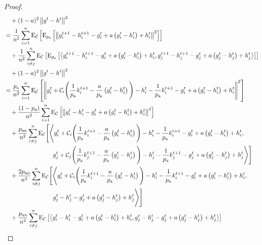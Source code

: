 \documentclass{article}
\newcommand*{\probavailable}{\ensuremath{p_{\textnormal{a}}}}
\newcommand*{\probpairaa}{\ensuremath{p_{\textnormal{aa}}}}
\newcommand*{\probpairan}{\ensuremath{p_{\textnormal{an}}}}
\newcommand*{\probpairnn}{\ensuremath{p_{\textnormal{nn}}}}
\begin{document}
\begin{proof}
\begin{align*}
    &\quad + (1 - a)^2\norm{g^{t} - h^{t}}^2\\
    &=\frac{1}{n^2}\sum_{i=1}^n\ExpSub{\cC}{\ExpSub{\probavailable}{\norm{g^{t+1}_i - h^{t+1}_i - g^{t}_i + a \left(g^{t}_i - h^{t}_i\right) + h^{t}_i}^2}} \\
    &\quad +\frac{1}{n^2}\sum_{i \neq j}^n\ExpSub{\cC}{\ExpSub{\probavailable}{\inp{g^{t+1}_i - h^{t+1}_i - g^{t}_i + a \left(g^{t}_i - h^{t}_i\right) + h^{t}_i}{g^{t+1}_j - h^{t+1}_j - g^{t}_j + a \left(g^{t}_j - h^{t}_j\right) + h^{t}_j}}} \\
    &\quad + (1 - a)^2\norm{g^{t} - h^{t}}^2\\
    &=\frac{\probavailable}{n^2}\sum_{i=1}^n\ExpSub{\cC}{\norm{g^{t}_i + \cC_i\Bigg(\frac{1}{\probavailable}k^{t+1}_i - \frac{a}{\probavailable} \left(g^{t}_i - h^{t}_i\right)\Bigg) - h^{t}_i - \frac{1}{\probavailable}k^{t+1}_i - g^{t}_i + a \left(g^{t}_i - h^{t}_i\right) + h^{t}_i}^2} \\
    &\quad+ \frac{(1 - \probavailable)}{n^2}\sum_{i=1}^n\ExpSub{\cC}{\norm{g^{t}_i - h^{t}_i - g^{t}_i + a \left(g^{t}_i - h^{t}_i\right) + h^{t}_i}^2} \\
    &\quad +\frac{\probpairaa}{n^2}\sum_{i \neq j}^n{\rm E}_{\cC}\Bigg[\Bigg\langle g^{t}_i + \cC_i\Bigg(\frac{1}{\probavailable}k^{t+1}_i - \frac{a}{\probavailable} \left(g^{t}_i - h^{t}_i\right)\Bigg) - h^{t}_i - \frac{1}{\probavailable}k^{t+1}_i - g^{t}_i + a \left(g^{t}_i - h^{t}_i\right) + h^{t}_i, \\
    &\qquad\qquad\qquad\qquad g^{t}_j + \cC_j\Bigg(\frac{1}{\probavailable}k^{t+1}_j - \frac{a}{\probavailable}\left(g^{t}_j - h^{t}_j\right)\Bigg) - h^{t}_j - \frac{1}{\probavailable}k^{t+1}_j - g^{t}_j + a \left(g^{t}_j - h^{t}_j\right) + h^{t}_j\Bigg\rangle\Bigg] \\
    &\quad +\frac{2\probpairan}{n^2}\sum_{i \neq j}^n{\rm E}_{\cC}\Bigg[\Bigg\langle g^{t}_i + \cC_i\Bigg(\frac{1}{\probavailable}k^{t+1}_i - \frac{a}{\probavailable} \left(g^{t}_i - h^{t}_i\right)\Bigg) - h^{t}_i - \frac{1}{\probavailable}k^{t+1}_i - g^{t}_i + a \left(g^{t}_i - h^{t}_i\right) + h^{t}_i,\\
    &\qquad\qquad\qquad\qquad g^{t}_j - h^{t}_j - g^{t}_j + a \left(g^{t}_j - h^{t}_j\right) + h^{t}_j\Bigg\rangle\Bigg] \\
    &\quad +\frac{\probpairnn}{n^2}\sum_{i \neq j}^n\ExpSub{\cC}{\inp{g^{t}_i - h^{t}_i - g^{t}_i + a \left(g^{t}_i - h^{t}_i\right) + h^{t}_i}{g^{t}_j - h^{t}_j - g^{t}_j + a \left(g^{t}_j - h^{t}_j\right) + h^{t}_j}} \\

\end{align*}
\end{proof}
\end{document}
